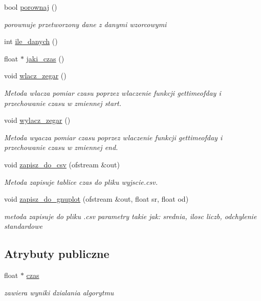 \begin{DoxyCompactItemize}
bool \hyperlink{classalgorytm_a167adca6239e12cb5d362fd7c905dde0}{porownaj} ()
\begin{DoxyCompactList}\small\item\em porownuje przetworzony dane z danymi wzorcowymi \end{DoxyCompactList}\item 
int \hyperlink{classalgorytm_acbd9260a0b2055acee485f737b960992}{ile\-\_\-danych} ()
\item 
float $\ast$ \hyperlink{classalgorytm_adcd99d6f8b10e222f47fd61328b84c67}{jaki\-\_\-czas} ()
\item 
void \hyperlink{classalgorytm_a5ace80a05bfc1305938d173753102ea2}{wlacz\-\_\-zegar} ()
\begin{DoxyCompactList}\small\item\em \-Metoda wlacza pomiar czasu poprzez wlaczenie funkcji {\ttfamily gettimeofday} i przechowanie czasu w zmiennej {\ttfamily start}. \end{DoxyCompactList}\item 
void \hyperlink{classalgorytm_a12c132e1a407f5dd38796f4d24308a6c}{wylacz\-\_\-zegar} ()
\begin{DoxyCompactList}\small\item\em \-Metoda wyacza pomiar czasu poprzez wlaczenie funkcji {\ttfamily gettimeofday} i przechowanie czasu w zmiennej {\ttfamily end}. \end{DoxyCompactList}\item 
void \hyperlink{classalgorytm_a8354af1fb9c7452012a6defcf98d39d8}{zapisz\-\_\-do\-\_\-csv} (ofstream \&out)
\begin{DoxyCompactList}\small\item\em \-Metoda zapisuje tablice {\ttfamily czas} do pliku {\ttfamily wyjscie.\-csv}. \end{DoxyCompactList}\item 
void \hyperlink{classalgorytm_ad2051f4366b78a7c73adc8b3418a495c}{zapisz\-\_\-do\-\_\-gnuplot} (ofstream \&out, float sr, float od)
\begin{DoxyCompactList}\small\item\em metoda zapisuje do pliku .csv parametry takie jak\-: srednia, ilosc liczb, odchylenie standardowe \end{DoxyCompactList}\end{DoxyCompactItemize}
\subsection*{\-Atrybuty publiczne}
\begin{DoxyCompactItemize}
\item 
float $\ast$ \hyperlink{classalgorytm_a8005d5f3266848b756400e3bb189de58}{czas}
\begin{DoxyCompactList}\small\item\em zawiera wyniki dzialania algorytmu \end{DoxyCompactList}\end{DoxyCompactItemize}
